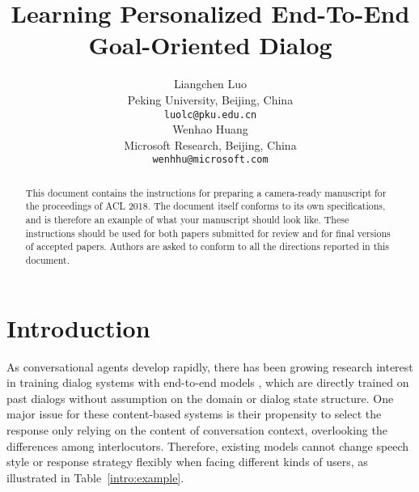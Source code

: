 \documentclass[11pt,a4paper]{article}
\title{Learning Personalized End-To-End Goal-Oriented Dialog}
\author{
    Liangchen Luo \\
    Peking University, Beijing, China \\
    {\tt luolc@pku.edu.cn} \\ 
    \And
    Wenhao Huang \\
    Microsoft Research, Beijing, China \\
    {\tt wenhhu@microsoft.com} \\
}
\date{}
\begin{document}
\maketitle
\begin{abstract}
  This document contains the instructions for preparing a camera-ready
  manuscript for the proceedings of ACL 2018. The document itself
  conforms to its own specifications, and is therefore an example of
  what your manuscript should look like. These instructions should be
  used for both papers submitted for review and for final versions of
  accepted papers.  Authors are asked to conform to all the directions
  reported in this document.
\end{abstract}

\section{Introduction}

As conversational agents develop rapidly, there has been growing research interest in training dialog systems with end-to-end models \cite{DBLP:journals/corr/VinyalsL15, sordoni-EtAl:2015:NAACL-HLT, bordes2016learning, NIPS2015_MemN2N}, which are directly trained on past dialogs without assumption on the domain or dialog state structure.
One major issue for these content-based systems is their propensity to select the response only relying on the content of conversation context, overlooking the differences among interlocutors.
Therefore, existing models cannot change speech style or response strategy flexibly when facing different kinds of users, as illustrated in Table~\ref{intro:example}.
\end{document}
